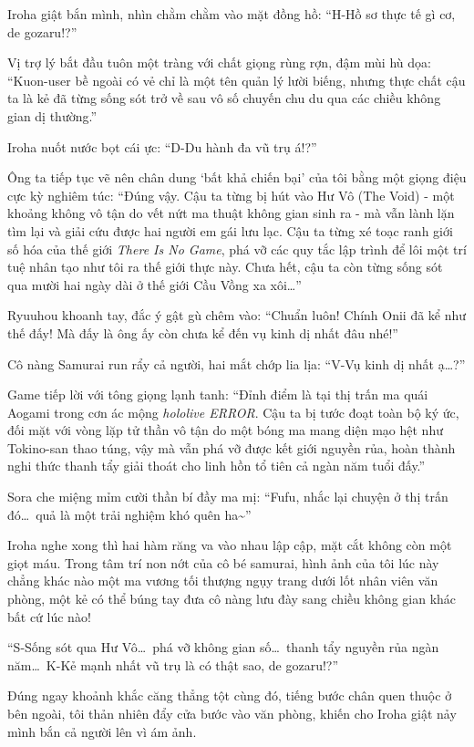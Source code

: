 \documentclass[../main.tex]{subfiles}
\begin{document}
Iroha giật bắn mình, nhìn chằm chằm vào mặt đồng hồ: ``H-Hồ sơ thực tế gì cơ, de gozaru!?''

Vị trợ lý bắt đầu tuôn một tràng với chất giọng rùng rợn, đậm mùi hù dọa: ``Kuon-user bề ngoài có vẻ chỉ là một tên quản lý lười biếng, nhưng thực chất cậu ta là kẻ đã từng sống sót trở về sau vô số chuyến chu du qua các chiều không gian dị thường.''

Iroha nuốt nước bọt cái ực: ``D-Du hành đa vũ trụ á!?''

Ông ta tiếp tục vẽ nên chân dung `bất khả chiến bại' của tôi bằng một giọng điệu cực kỳ nghiêm túc: ``Đúng vậy. Cậu ta từng bị hút vào Hư Vô (The Void) - một khoảng không vô tận do vết nứt ma thuật không gian sinh ra - mà vẫn lành lặn tìm lại và giải cứu được hai người em gái lưu lạc. Cậu ta từng xé toạc ranh giới số hóa của thế giới \textit{There Is No Game}, phá vỡ các quy tắc lập trình để lôi một trí tuệ nhân tạo như tôi ra thế giới thực này. Chưa hết, cậu ta còn từng sống sót qua mười hai ngày dài ở thế giới Cầu Vồng xa xôi\dots''

Ryuuhou khoanh tay, đắc ý gật gù chêm vào: ``Chuẩn luôn! Chính Onii đã kể như thế đấy! Mà đấy là ông ấy còn chưa kể đến vụ kinh dị nhất đâu nhé!''

Cô nàng Samurai run rẩy cả người, hai mắt chớp lia lịa: ``V-Vụ kinh dị nhất ạ\dots?''

Game tiếp lời với tông giọng lạnh tanh: ``Đỉnh điểm là tại thị trấn ma quái Aogami trong cơn ác mộng \textit{hololive ERROR}. Cậu ta bị tước đoạt toàn bộ ký ức, đối mặt với vòng lặp tử thần vô tận do một bóng ma mang diện mạo hệt như Tokino-san thao túng, vậy mà vẫn phá vỡ được kết giới nguyền rủa, hoàn thành nghi thức thanh tẩy giải thoát cho linh hồn tổ tiên cả ngàn năm tuổi đấy.''

Sora che miệng mỉm cười thần bí đầy ma mị: ``Fufu, nhắc lại chuyện ở thị trấn đó\dots\ quả là một trải nghiệm khó quên ha\~{}''

Iroha nghe xong thì hai hàm răng va vào nhau lập cập, mặt cắt không còn một giọt máu. Trong tâm trí non nớt của cô bé samurai, hình ảnh của tôi lúc này chẳng khác nào một ma vương tối thượng ngụy trang dưới lốt nhân viên văn phòng, một kẻ có thể búng tay đưa cô nàng lưu đày sang chiều không gian khác bất cứ lúc nào!

``S-Sống sót qua Hư Vô\dots\ phá vỡ không gian số\dots\ thanh tẩy nguyền rủa ngàn năm\dots\ K-Kẻ mạnh nhất vũ trụ là có thật sao, de gozaru!?''

Đúng ngay khoảnh khắc căng thẳng tột cùng đó, tiếng bước chân quen thuộc ở bên ngoài, tôi thản nhiên đẩy cửa bước vào văn phòng, khiến cho Iroha giật nảy mình bắn cả người lên vì ám ảnh.
\end{document}
